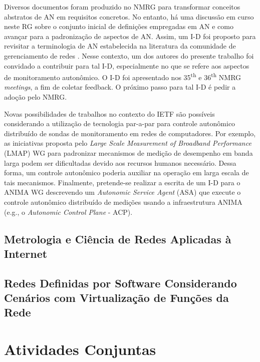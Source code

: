 \documentclass[12pt]{article}
\begin{document}

Diversos documentos foram produzido no NMRG para transformar conceitos abstratos de AN em requisitos concretos. No entanto, há uma discussão em curso neste RG sobre o conjunto inicial de definições empregadas em AN e como avançar para a padronização de aspectos de AN. Assim, um I-D foi proposto para revisitar a terminologia de AN estabelecida na literatura da comunidade de gerenciamento de redes \cite{NMRG-Pentikousis-2015}. Nesse contexto, um dos autores do presente trabalho foi convidado a contribuir para tal I-D, especialmente no que se refere aos aspectos de monitoramento autonômico. O I-D foi apresentado nos 35\textsuperscript{th} e 36\textsuperscript{th} NMRG \textit{meetings}, a fim de coletar feedback. O próximo passo para tal I-D é pedir a adoção pelo NMRG.


Novas possibilidades de trabalhos no contexto do IETF são possíveis considerando a utilização de tecnologia par-a-par para controle autonômico distribuído de sondas de monitoramento em redes de computadores. Por exemplo, as iniciativas proposta pelo \textit{Large Scale Measurement of Broadband Performance} (LMAP) WG para padronizar mecanismos de medição de desempenho em banda larga podem ser dificultadas devido aos recursos humanos necessário. Dessa forma, um controle autonômico poderia auxiliar na operação em larga escala de tais mecanismos. Finalmente, pretende-se realizar a escrita de um I-D para o ANIMA WG descrevendo um \textit{Autonomic Service Agent} (ASA) que execute o controle autonômico distribuído de medições usando a infraestrutura ANIMA (e.g., o \textit{Autonomic Control Plane} - ACP).

\subsection{Metrologia e Ciência de Redes Aplicadas à Internet}

\subsection{Redes Definidas por Software Considerando Cenários com Virtualização de Funções da Rede}

\section{Atividades Conjuntas}

\end{document}
